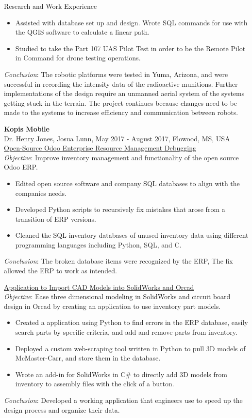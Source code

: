 \documentclass{resume} %
\begin{document}
\begin{rSection}{Research and Work Experience}
\begin{itemize}
    \item Assisted with database set up and design. Wrote SQL commands for use with the QGIS software to calculate a linear path.
    \item Studied to take the Part 107 UAS Pilot Test in order to be the Remote Pilot in Command for drone testing operations. 
\end{itemize}
{\em Conclusion}: The robotic platforms were tested in Yuma, Arizona, and were successful in recording the intensity data of the radioactive munitions. Further implementations of the design require an unmanned aerial system  of the systems getting stuck in the terrain. The project continues because changes need to be made to the systems to increase efficiency and communication between robots. 

\newpage

{\bf Kopis Mobile}\\
Dr. Henry Jones, Josua Lunn, May 2017 - August 2017, Flowood, MS, USA
\\{\underline{Open-Source Odoo Enterprise Resource Management Debugging}}
\smallskip
\\{\em Objective}: Improve inventory management and functionality of the open source Odoo ERP. 
\begin{itemize}
    \item  Edited open source software and company SQL databases to align with the companies needs. 
    \item  Developed Python scripts to recursively fix mistakes that arose from a transition of ERP versions.  
    \item  Cleaned the SQL inventory databases of unused inventory data using different programming languages including Python, SQL, and C. 
\end{itemize}
{\em Conclusion}: The broken database items were recognized by the ERP, The fix allowed the ERP to work as intended.


{\underline{Application to Import CAD Models into SolidWorks and Orcad}}
\smallskip
\\{\em Objective}: Ease three dimensional modeling in SolidWorks and circuit board design in Orcad by creating an application to use inventory part models. 
\begin{itemize}
    \item Created a application using Python to find errors in the ERP database, easily search parts by specific criteria, and add and remove parts from inventory. 
    \item Deployed a custom web-scraping tool written in Python to pull 3D models of McMaster-Carr, and store them in the database. 
    \item Wrote an add-in for SolidWorks in C\# to directly add 3D models from inventory to assembly files with the click of a button. 
\end{itemize}
{\em Conclusion}: Developed a working application that engineers use to speed up the design process and organize their data. 




\end{rSection}
\end{document}
